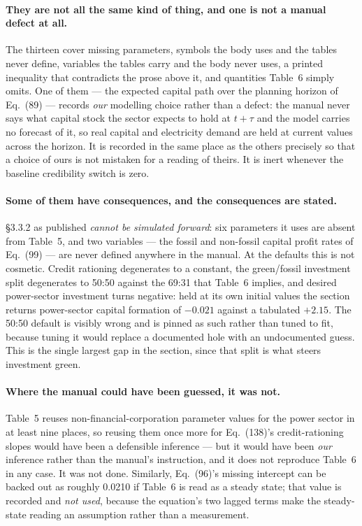 \paragraph{They are not all the same kind of thing, and one is not a manual defect at all.} The thirteen cover missing parameters, symbols the body uses and the tables never define, variables the tables carry and the body never uses, a printed inequality that contradicts the prose above it, and quantities Table~6 simply omits. One of them --- the expected capital path over the planning horizon of Eq.~(89) --- records \emph{our} modelling choice rather than a defect: the manual never says what capital stock the sector expects to hold at $t+\tau$ and the model carries no forecast of it, so real capital and electricity demand are held at current values across the horizon. It is recorded in the same place as the others precisely so that a choice of ours is not mistaken for a reading of theirs. It is inert whenever the baseline credibility switch is zero.

\paragraph{Some of them have consequences, and the consequences are stated.} \S3.3.2 as published \emph{cannot be simulated forward}: six parameters it uses are absent from Table~5, and two variables --- the fossil and non-fossil capital profit rates of Eq.~(99) --- are never defined anywhere in the manual. At the defaults this is not cosmetic. Credit rationing degenerates to a constant, the green/fossil investment split degenerates to 50:50 against the 69:31 that Table~6 implies, and desired power-sector investment turns negative: held at its own initial values the section returns power-sector capital formation of $-0.021$ against a tabulated $+2.15$. The 50:50 default is visibly wrong and is pinned as such rather than tuned to fit, because tuning it would replace a documented hole with an undocumented guess. This is the single largest gap in the section, since that split is what steers investment green.

\paragraph{Where the manual could have been guessed, it was not.} Table~5 reuses non-financial-corporation parameter values for the power sector in at least nine places, so reusing them once more for Eq.~(138)'s credit-rationing slopes would have been a defensible inference --- but it would have been \emph{our} inference rather than the manual's instruction, and it does not reproduce Table~6 in any case. It was not done. Similarly, Eq.~(96)'s missing intercept can be backed out as roughly 0.0210 if Table~6 is read as a steady state; that value is recorded and \emph{not used}, because the equation's two lagged terms make the steady-state reading an assumption rather than a measurement.


